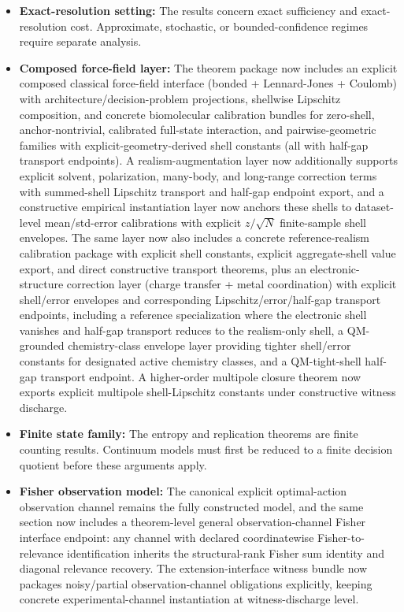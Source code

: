 \begin{itemize}
	\item \textbf{Exact-resolution setting:} The results concern exact sufficiency and exact-resolution cost. Approximate, stochastic, or bounded-confidence regimes require separate analysis.
	\item \textbf{Composed force-field layer:} The theorem package now includes an explicit composed classical force-field interface (bonded + Lennard-Jones + Coulomb) with architecture/decision-problem projections, shellwise Lipschitz composition, and concrete biomolecular calibration bundles for zero-shell, anchor-nontrivial, calibrated full-state interaction, and pairwise-geometric families with explicit-geometry-derived shell constants (all with half-gap transport endpoints). A realism-augmentation layer now additionally supports explicit solvent, polarization, many-body, and long-range correction terms with summed-shell Lipschitz transport and half-gap endpoint export, and a constructive empirical instantiation layer now anchors these shells to dataset-level mean/std-error calibrations with explicit $z/\sqrt{N}$ finite-sample shell envelopes. The same layer now also includes a concrete reference-realism calibration package with explicit shell constants, explicit aggregate-shell value export, and direct constructive transport theorems, plus an electronic-structure correction layer (charge transfer + metal coordination) with explicit shell/error envelopes and corresponding Lipschitz/error/half-gap transport endpoints, including a reference specialization where the electronic shell vanishes and half-gap transport reduces to the realism-only shell, a QM-grounded chemistry-class envelope layer providing tighter shell/error constants for designated active chemistry classes, and a QM-tight-shell half-gap transport endpoint. A higher-order multipole closure theorem now exports explicit multipole shell-Lipschitz constants under constructive witness discharge.
	\item \textbf{Finite state family:} The entropy and replication theorems are finite counting results. Continuum models must first be reduced to a finite decision quotient before these arguments apply.
	\item \textbf{Fisher observation model:} The canonical explicit optimal-action observation channel remains the fully constructed model, and the same section now includes a theorem-level general observation-channel Fisher interface endpoint: any channel with declared coordinatewise Fisher-to-relevance identification inherits the structural-rank Fisher sum identity and diagonal relevance recovery. The extension-interface witness bundle now packages noisy/partial observation-channel obligations explicitly, keeping concrete experimental-channel instantiation at witness-discharge level.

\end{itemize}

